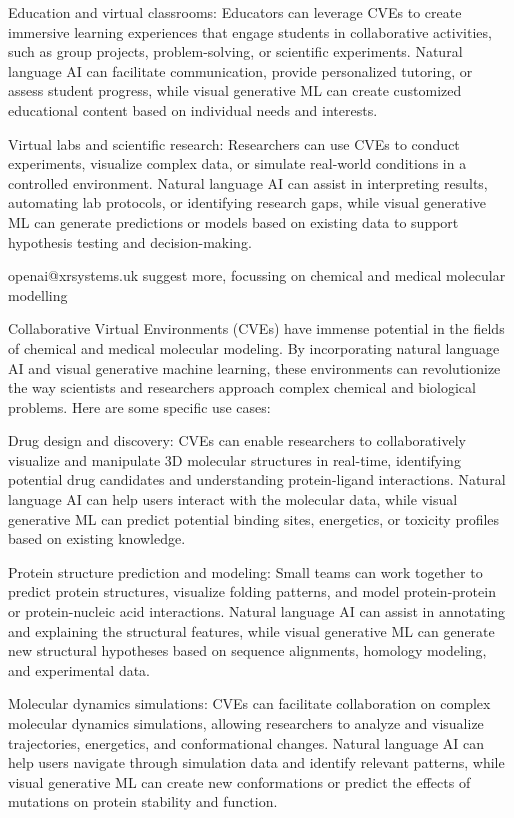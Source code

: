     Education and virtual classrooms:
    Educators can leverage CVEs to create immersive learning experiences that engage students in collaborative activities, such as group projects, problem-solving, or scientific experiments. Natural language AI can facilitate communication, provide personalized tutoring, or assess student progress, while visual generative ML can create customized educational content based on individual needs and interests.

    Virtual labs and scientific research:
    Researchers can use CVEs to conduct experiments, visualize complex data, or simulate real-world conditions in a controlled environment. Natural language AI can assist in interpreting results, automating lab protocols, or identifying research gaps, while visual generative ML can generate predictions or models based on existing data to support hypothesis testing and decision-making.

openai@xrsystems.uk
suggest more, focussing on chemical and medical molecular modelling

Collaborative Virtual Environments (CVEs) have immense potential in the fields of chemical and medical molecular modeling. By incorporating natural language AI and visual generative machine learning, these environments can revolutionize the way scientists and researchers approach complex chemical and biological problems. Here are some specific use cases:

    Drug design and discovery:
    CVEs can enable researchers to collaboratively visualize and manipulate 3D molecular structures in real-time, identifying potential drug candidates and understanding protein-ligand interactions. Natural language AI can help users interact with the molecular data, while visual generative ML can predict potential binding sites, energetics, or toxicity profiles based on existing knowledge.

    Protein structure prediction and modeling:
    Small teams can work together to predict protein structures, visualize folding patterns, and model protein-protein or protein-nucleic acid interactions. Natural language AI can assist in annotating and explaining the structural features, while visual generative ML can generate new structural hypotheses based on sequence alignments, homology modeling, and experimental data.

    Molecular dynamics simulations:
    CVEs can facilitate collaboration on complex molecular dynamics simulations, allowing researchers to analyze and visualize trajectories, energetics, and conformational changes. Natural language AI can help users navigate through simulation data and identify relevant patterns, while visual generative ML can create new conformations or predict the effects of mutations on protein stability and function.


